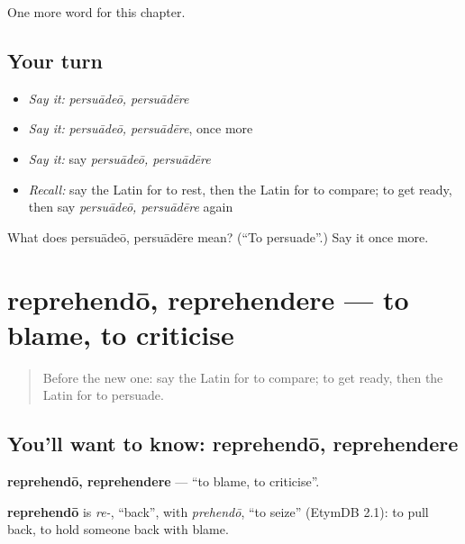 \begin{grammarlens}[title={What you've built}]
One more word for this chapter.
\end{grammarlens}

\subsection*{Your turn}
\begin{itemize}
\raggedright
  \item \emph{Say it:} \emph{persuādeō, persuādēre}
  \item \emph{Say it:} \emph{persuādeō, persuādēre}, once more
  \item \emph{Say it:} say \emph{persuādeō, persuādēre}
  \item \emph{Recall:} say the Latin for to rest, then the Latin for to compare; to get ready, then say \emph{persuādeō, persuādēre} again
\end{itemize}

\begin{tcolorbox}[breakable,colback=teal!4,colframe=teal!35!black,title={Before you move on}]
What does persuādeō, persuādēre mean? (\textquotedblleft{}To persuade\textquotedblright{}.) Say it once more.
\end{tcolorbox}
\section[reprehendō, reprehendere]{reprehendō, reprehendere — to blame, to criticise}

\label{lesson:LA-C199-reprehendo}



\begin{quote}
Before the new one: say the Latin for to compare; to get ready, then the Latin for to persuade.
\end{quote}

\subsection*{You'll want to know: reprehendō, reprehendere}
\textbf{reprehendō, reprehendere} — \textquotedblleft{}to blame, to criticise\textquotedblright{}.

\begin{cousinweb}
\textbf{reprehendō} is \emph{re-}, \textquotedblleft{}back\textquotedblright{}, with \emph{prehendō}, \textquotedblleft{}to seize\textquotedblright{} (EtymDB 2.1): to pull back, to hold someone back with blame.
\end{cousinweb}

